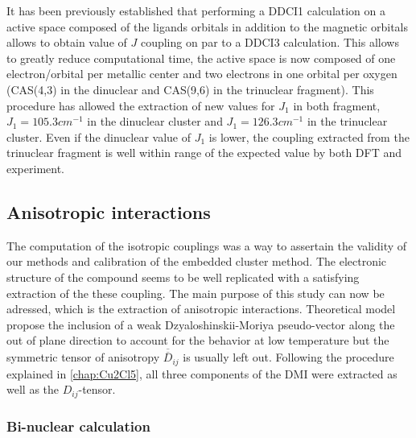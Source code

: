 \documentclass[10pt]{report}
\numberwithin{equation}{section}
\begin{document}
It has been previously established that performing a DDCI1 calculation on a active space composed of the ligands orbitals in addition to the magnetic orbitals allows to obtain value of $J$ coupling on par to a DDCI3 calculation.
This allows to greatly reduce computational time, the active space is now composed of one electron/orbital per metallic center and two electrons in one orbital per oxygen (CAS(4,3) in the dinuclear and CAS(9,6) in the trinuclear fragment).
This procedure has allowed the extraction of new values for $J_1$ in both fragment, $J_1=105.3 cm^{-1}$ in the dinuclear cluster and $J_1=126.3 cm^{-1}$ in the trinuclear cluster.
Even if the dinuclear value of $J_1$ is lower, the coupling extracted from the trinuclear fragment is well within range of the expected value by both DFT and experiment.




\subsection{Anisotropic interactions}

The computation of the isotropic couplings was a way to assertain the validity of our methods and calibration of the embedded cluster method.
The electronic structure of the compound seems to be well replicated with a satisfying extraction of the these coupling.
The main purpose of this study can now be adressed, which is the extraction of anisotropic interactions.
Theoretical model propose the inclusion of a weak Dzyaloshinskii-Moriya pseudo-vector along the out of plane direction to account for the behavior at low temperature but the symmetric tensor of anisotropy $\overline{\overline{D}}_{ij}$ is usually left out.
Following the procedure explained in \ref{chap:Cu2Cl5}, all three components of the DMI were extracted as well as the $D_{ij}$-tensor.

\subsubsection*{Bi-nuclear calculation}
\end{document}
